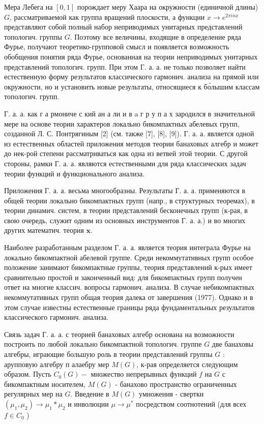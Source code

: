 \documentclass[10pt]{article}
\begin{document}
Мера Лебега на $[0,1]$ порождает меру Хаара на окружности (единичной длины) $G$, рассматриваемой как группа вращений плоскости, а функции $x \rightarrow e^{2 \pi i n x}$ представляют собой полный набор неприводимых унитарных представлений топологич. группы $G$. Поэтому все величины, входящие в определение ряда Фурье, получают теоретико-групповой смысл и появляется возможность обобщения понятия ряда Фурье, основанная на теории неприводимых унитарных представлений топологич. групп. При этом Г. а. а. не только позволяет найти естественную форму результатов классического гармонич. анализа на прямой или окружности, но и установить новые результаты, относящиеся к бо́лышим классам топологич. групп.



Г. а. а. как г а рмониче с кий ан а ли и в $\mathrm{a}$ г р у п а х зародился в значительной мере на основе теории характеров локально бикомпактных абелевых групп, созданной Л. С. Понтрягиным [2] (см. также [7], [8], [9]). Г. а. а. является одной из естественных областей приложения методов теории банаховых алгебр и может до нек-рой степени рассматриваться как одна из ветвей этой теории. С другой стороны, рамки Г. а. а. являются естественными для ряда классических задач теории функций и функционального анализа.



Приложения Г. а. а. весьма многообразны. Результаты Г. а. а. применяются в общей теории локально бикомпактных групп (напр., в структурных теоремах), в теории динамич. систем, в теории представлений бесконечных групп (к-рая, в свою очередь, служит одним из основных инструментов $Г$. а. а.) и во многих других математич. теория $\mathbf{x}$.



Наиболее разработанным разделом Г. а. а. является теория интеграла Фурье на локально бикомпактной абелевой группе. Среди некоммутативных групп особое положение занимают бикомпактные группы, теория представлений к-рых имеет сравнительно простой и законченный вид: для бикомпактных групп получен ответ на многие классич. вопросы гармонич. анализа. В случае небикомпактных некоммутативных групп общая теория далека от завершения (1977). Однако и в этом случае известны естественные границы ряда фундаментальных результатов классического гармонич. анализа.



Связь задач Г. а. а. с теорией банаховых алгебр основана на возможности построить по любой локально бикомпактной топологич. группе $G$ две банаховы алгебры, играющие большую роль в теории представлений группы $G$ : арупповую алгебру п алаебру мер $M(G)$, к-рая определяется следующим образом. Пусть $C_{0}(G)-$ множество непрерывных функций $f$ на $G$ с бикомпактным носителем, $M(G)$ - банахово пространство ограниченных регулярных мер на $G$. Введение в $M(G)$ умножения - свертки $\left(\mu_{1}, \mu_{2}\right) \rightarrow \mu_{1} * \mu_{2}$ и инволюции $\mu \rightarrow \mu^{*}$ посредством соотнотений (для всех $f \in C_{0}$ )
\end{document}
